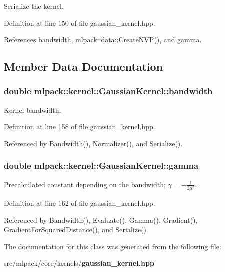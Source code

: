 Serialize the kernel. 



Definition at line 150 of file gaussian\+\_\+kernel.\+hpp.



References bandwidth, mlpack\+::data\+::\+Create\+N\+V\+P(), and gamma.



\subsection{Member Data Documentation}
\subsubsection[{bandwidth}]{\setlength{\rightskip}{0pt plus 5cm}double mlpack\+::kernel\+::\+Gaussian\+Kernel\+::bandwidth\hspace{0.3cm}{\ttfamily [private]}}\label{classmlpack_1_1kernel_1_1GaussianKernel_abda0129ea431b857678f9c4ec9fab151}


Kernel bandwidth. 



Definition at line 158 of file gaussian\+\_\+kernel.\+hpp.



Referenced by Bandwidth(), Normalizer(), and Serialize().

\subsubsection[{gamma}]{\setlength{\rightskip}{0pt plus 5cm}double mlpack\+::kernel\+::\+Gaussian\+Kernel\+::gamma\hspace{0.3cm}{\ttfamily [private]}}\label{classmlpack_1_1kernel_1_1GaussianKernel_a7f019a726e3dca20edb7721ad994fe6a}


Precalculated constant depending on the bandwidth; $ \gamma = -\frac{1}{2 \mu^2} $. 



Definition at line 162 of file gaussian\+\_\+kernel.\+hpp.



Referenced by Bandwidth(), Evaluate(), Gamma(), Gradient(), Gradient\+For\+Squared\+Distance(), and Serialize().



The documentation for this class was generated from the following file\+:\begin{DoxyCompactItemize}
\item 
src/mlpack/core/kernels/{\bf gaussian\+\_\+kernel.\+hpp}\end{DoxyCompactItemize}
